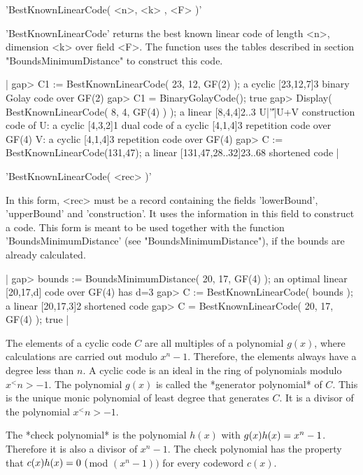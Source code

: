 
'BestKnownLinearCode( <n>, <k> , <F> )'

'BestKnownLinearCode' returns the best  known linear code of  length <n>,
dimension <k> over field  <F>. The function uses  the tables described in
section "BoundsMinimumDistance" to construct this code.

|    gap> C1 := BestKnownLinearCode( 23, 12, GF(2) );
    a cyclic [23,12,7]3 binary Golay code over GF(2)
    gap> C1 = BinaryGolayCode();
    true
    gap> Display( BestKnownLinearCode( 8, 4, GF(4) ) );
    a linear [8,4,4]2..3 U|'\|'|U+V construction code of
    U: a cyclic [4,3,2]1 dual code of
       a cyclic [4,1,4]3 repetition code over GF(4)
    V: a cyclic [4,1,4]3 repetition code over GF(4)
    gap> C := BestKnownLinearCode(131,47);
    a linear [131,47,28..32]23..68 shortened code |

'BestKnownLinearCode( <rec> )'

In this form, <rec> must be a record  containing the fields 'lowerBound',
'upperBound' and 'construction'. It uses the information in this field to
construct a code.   This form is   meant to  be  used together  with  the
function 'BoundsMinimumDistance'    (see "BoundsMinimumDistance"), if the
bounds are already calculated.

|    gap> bounds := BoundsMinimumDistance( 20, 17, GF(4) );
    an optimal linear [20,17,d] code over GF(4) has d=3
    gap> C := BestKnownLinearCode( bounds );
    a linear [20,17,3]2 shortened code
    gap> C = BestKnownLinearCode( 20, 17, GF(4) );
    true |


The  elements of  a cyclic  code $C$ are   all multiples of  a polynomial
$g(x)$, where calculations are carried out modulo $x^n-1$. Therefore, the
elements always have a degree less than $n$. A cyclic code is an ideal in
the ring  of polynomials  modulo $x^<n>  - 1$. The  polynomial $g(x)$  is
called the  *generator polynomial*  of  $C$. This   is the  unique  monic
polynomial  of least degree that generates  $C$. It is  a  divisor of the
polynomial $x^<n>-1$.

The  *check polynomial*  is   the  polynomial  $h(x)$ with   $g(x)\*h(x)=
x^n-1$. Therefore it is  also a divisor of  $x^n-1$. The check polynomial
has  the property that   $c(x)\*h(x) =  0\ ($mod  $  (x^n-1))$ for  every
codeword $c(x)$.


